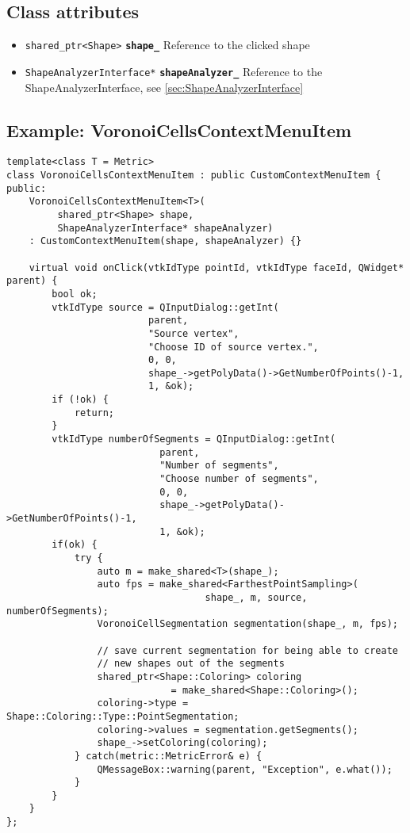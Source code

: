 \subsection{Class attributes}
\begin{itemize}
	\item \texttt{shared\_ptr<Shape>} \textbf{\texttt{shape\_}} Reference to the clicked shape
	\item \texttt{ShapeAnalyzerInterface*} \textbf{\texttt{shapeAnalyzer\_}} Reference to the ShapeAnalyzerInterface, see \ref{sec:ShapeAnalyzerInterface}
\end{itemize}

\subsection{Example: VoronoiCellsContextMenuItem}
\label{subsec:ExampleVoronoiCellsContextMenuItem}

\begin{lstlisting}[style=lstStyleCpp, caption={VoronoiCellsContextMenuItem.h}]
template<class T = Metric>
class VoronoiCellsContextMenuItem : public CustomContextMenuItem {
public:
    VoronoiCellsContextMenuItem<T>(
         shared_ptr<Shape> shape, 
         ShapeAnalyzerInterface* shapeAnalyzer) 
    : CustomContextMenuItem(shape, shapeAnalyzer) {}
    
    virtual void onClick(vtkIdType pointId, vtkIdType faceId, QWidget* parent) {
        bool ok;
        vtkIdType source = QInputDialog::getInt(
                         parent,
                         "Source vertex",
                         "Choose ID of source vertex.",
                         0, 0,
                         shape_->getPolyData()->GetNumberOfPoints()-1,
                         1, &ok);
        if (!ok) {
            return;
        }
        vtkIdType numberOfSegments = QInputDialog::getInt(
                           parent,
                           "Number of segments",
                           "Choose number of segments",
                           0, 0,
                           shape_->getPolyData()->GetNumberOfPoints()-1,
                           1, &ok);
        if(ok) {
            try {
                auto m = make_shared<T>(shape_);
                auto fps = make_shared<FarthestPointSampling>(
                                   shape_, m, source, numberOfSegments);
                VoronoiCellSegmentation segmentation(shape_, m, fps);
                
                // save current segmentation for being able to create 
                // new shapes out of the segments
                shared_ptr<Shape::Coloring> coloring 
                             = make_shared<Shape::Coloring>();
                coloring->type = Shape::Coloring::Type::PointSegmentation;
                coloring->values = segmentation.getSegments();
                shape_->setColoring(coloring);
            } catch(metric::MetricError& e) {
                QMessageBox::warning(parent, "Exception", e.what());
            }
        }
    }
};

\end{lstlisting}

